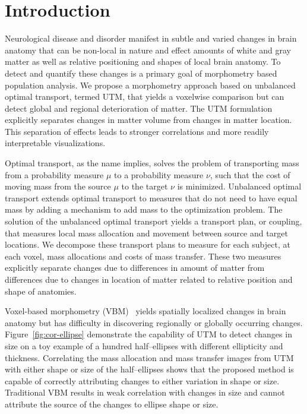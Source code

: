 \documentclass{llncs}
\begin{document}
\section{Introduction}
Neurological disease and disorder manifest in subtle and varied changes in
brain anatomy that can be non-local in nature and effect amounts of white and
gray matter as well as relative positioning and shapes of local brain anatomy.
To detect and quantify these changes is a primary goal of morphometry based
population analysis. We propose a morphometry approach based on unbalanced
optimal transport, termed UTM, that yields a voxelwise comparison but can
detect global and regional deterioration of matter. The UTM formulation
explicitly separates changes in matter volume from changes in matter location.
This separation of effects leads to stronger correlations and more readily
interpretable visualizations. 

Optimal transport, as the name implies, solves the problem of transporting mass
from a probability measure $\mu$ to a probability measure $\nu$, such that the
cost of moving mass from the source $\mu$ to the target $\nu$ is minimized.
Unbalanced optimal transport extends optimal transport to measures that do not
need to have equal mass by adding a mechanism to add mass to the optimization
problem. The solution of the unbalanced optimal transport yields a transport
plan, or coupling, that measures local mass allocation and movement between
source and target locations. We decompose these transport plans to measure for
each subject, at each voxel, mass allocations and costs of mass transfer. These
two measures explicitly separate changes due to differences in amount of matter
from differences due to changes in location of matter related to relative
position and shape of anatomies. 

Voxel-based morphometry (VBM)~\cite{ashburner2000voxel} yields spatially
localized changes in brain anatomy but has difficulty in discovering regionally
or globally occurring changes. Figure~\ref{fig:cor-ellipse} demonstrate the
capability of UTM to detect changes in size on a toy example of a hundred
half--ellipses with different ellipticity and thickness.  Correlating the
mass allocation and mass transfer images from UTM with either shape or size of
the half--ellipses shows that the proposed method is capable of correctly
attributing changes to either variation in shape or size.  Traditional VBM
results in weak correlation with changes in size and cannot attribute the
source of the changes to ellipse shape or size.
\end{document}
